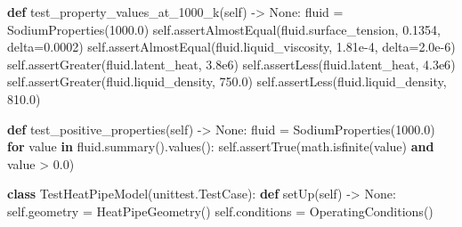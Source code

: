 \documentclass[
  12pt,
  12pt,a4paper,oneside]{report}
\newenvironment{Shaded}{}{}
\newcommand{\ControlFlowTok}[1]{\textcolor[rgb]{0.00,0.44,0.13}{\textbf{#1}}}
\newcommand{\FloatTok}[1]{\textcolor[rgb]{0.25,0.63,0.44}{#1}}
\newcommand{\KeywordTok}[1]{\textcolor[rgb]{0.00,0.44,0.13}{\textbf{#1}}}
\newcommand{\NormalTok}[1]{#1}
\newcommand{\OperatorTok}[1]{\textcolor[rgb]{0.40,0.40,0.40}{#1}}
\newcommand{\VariableTok}[1]{\textcolor[rgb]{0.10,0.09,0.49}{#1}}
\begin{document}
\begin{Shaded}
\begin{Highlighting}[]
    \KeywordTok{def}\NormalTok{ test\_property\_values\_at\_1000\_k(}\VariableTok{self}\NormalTok{) }\OperatorTok{{-}\textgreater{}} \VariableTok{None}\NormalTok{:}
\NormalTok{        fluid }\OperatorTok{=}\NormalTok{ SodiumProperties(}\FloatTok{1000.0}\NormalTok{)}
        \VariableTok{self}\NormalTok{.assertAlmostEqual(fluid.surface\_tension, }\FloatTok{0.1354}\NormalTok{, delta}\OperatorTok{=}\FloatTok{0.0002}\NormalTok{)}
        \VariableTok{self}\NormalTok{.assertAlmostEqual(fluid.liquid\_viscosity, }\FloatTok{1.81e{-}4}\NormalTok{, delta}\OperatorTok{=}\FloatTok{2.0e{-}6}\NormalTok{)}
        \VariableTok{self}\NormalTok{.assertGreater(fluid.latent\_heat, }\FloatTok{3.8e6}\NormalTok{)}
        \VariableTok{self}\NormalTok{.assertLess(fluid.latent\_heat, }\FloatTok{4.3e6}\NormalTok{)}
        \VariableTok{self}\NormalTok{.assertGreater(fluid.liquid\_density, }\FloatTok{750.0}\NormalTok{)}
        \VariableTok{self}\NormalTok{.assertLess(fluid.liquid\_density, }\FloatTok{810.0}\NormalTok{)}

    \KeywordTok{def}\NormalTok{ test\_positive\_properties(}\VariableTok{self}\NormalTok{) }\OperatorTok{{-}\textgreater{}} \VariableTok{None}\NormalTok{:}
\NormalTok{        fluid }\OperatorTok{=}\NormalTok{ SodiumProperties(}\FloatTok{1000.0}\NormalTok{)}
        \ControlFlowTok{for}\NormalTok{ value }\KeywordTok{in}\NormalTok{ fluid.summary().values():}
            \VariableTok{self}\NormalTok{.assertTrue(math.isfinite(value) }\KeywordTok{and}\NormalTok{ value }\OperatorTok{\textgreater{}} \FloatTok{0.0}\NormalTok{)}


\KeywordTok{class}\NormalTok{ TestHeatPipeModel(unittest.TestCase):}
    \KeywordTok{def}\NormalTok{ setUp(}\VariableTok{self}\NormalTok{) }\OperatorTok{{-}\textgreater{}} \VariableTok{None}\NormalTok{:}
        \VariableTok{self}\NormalTok{.geometry }\OperatorTok{=}\NormalTok{ HeatPipeGeometry()}
        \VariableTok{self}\NormalTok{.conditions }\OperatorTok{=}\NormalTok{ OperatingConditions()}


\end{Highlighting}
\end{Shaded}
\end{document}

